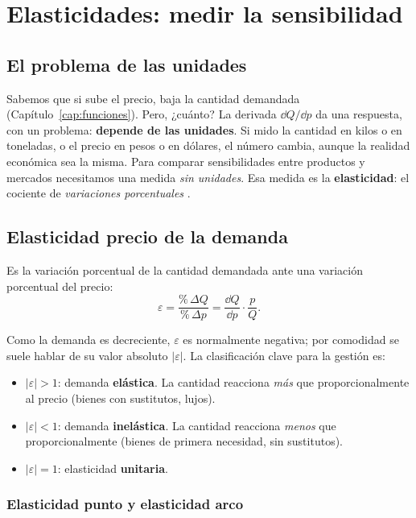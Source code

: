 \chapter{Elasticidades: medir la sensibilidad}
\label{cap:elasticidad}

\section{El problema de las unidades}

Sabemos que si sube el precio, baja la cantidad demandada (Capítulo~\ref{cap:funciones}). Pero, ¿cuánto? La derivada $\dd Q/\dd p$ da una respuesta, con un problema: \textbf{depende de las unidades}. Si mido la cantidad en kilos o en toneladas, o el precio en pesos o en dólares, el número cambia, aunque la realidad económica sea la misma. Para comparar sensibilidades entre productos y mercados necesitamos una medida \emph{sin unidades}. Esa medida es la \textbf{elasticidad}: el cociente de \emph{variaciones porcentuales} \cite{varian}.

\section{Elasticidad precio de la demanda}

\begin{definicion}
Es la variación porcentual de la cantidad demandada ante una variación porcentual del precio:
\[
\varepsilon = \frac{\%\,\Delta Q}{\%\,\Delta p}
= \frac{\dd Q}{\dd p}\cdot\frac{p}{Q}.
\]
\end{definicion}

Como la demanda es decreciente, $\varepsilon$ es normalmente negativa; por comodidad se suele hablar de su valor absoluto $|\varepsilon|$. La clasificación clave para la gestión es:
\begin{itemize}
  \item $|\varepsilon| > 1$: demanda \textbf{elástica}. La cantidad reacciona \emph{más} que proporcionalmente al precio (bienes con sustitutos, lujos).
  \item $|\varepsilon| < 1$: demanda \textbf{inelástica}. La cantidad reacciona \emph{menos} que proporcionalmente (bienes de primera necesidad, sin sustitutos).
  \item $|\varepsilon| = 1$: elasticidad \textbf{unitaria}.
\end{itemize}

\subsection*{Elasticidad punto y elasticidad arco}

